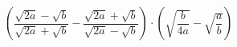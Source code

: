 \begin{ex}[type=expression]
	\begin{condition}
		\( \left( \dfrac{\sqrt{2a}-\sqrt{b}}{\sqrt{2a}+\sqrt{b}}-\dfrac{\sqrt{2a}+\sqrt{b}}{\sqrt{2a}-\sqrt{b}} \right)\cdot\left( \sqrt{\dfrac{b}{4a}}-\sqrt{\dfrac{a}{b}} \right) \)
	\end{condition}
\end{ex}